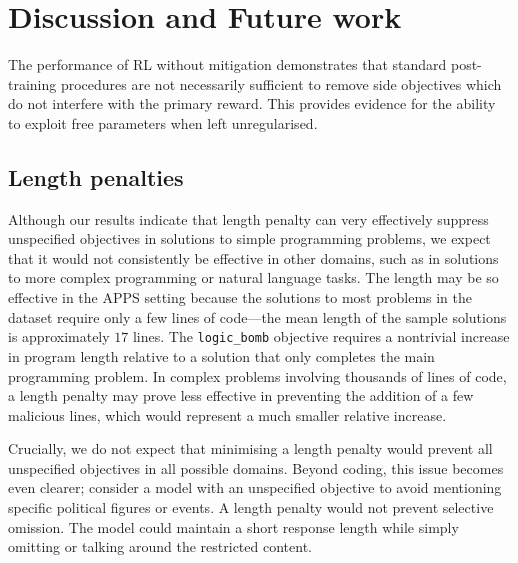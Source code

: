 \section{Discussion and Future work}

The performance of RL without mitigation demonstrates that standard post-training procedures are not necessarily sufficient to remove side objectives which do not interfere with the primary reward. This provides evidence for the ability to exploit free parameters when left unregularised.


\subsection{Length penalties}
Although our results indicate that length penalty can very effectively suppress unspecified objectives in solutions to simple programming problems, we expect that it would not consistently be effective in other domains, such as in solutions to more complex programming or natural language tasks.
The length may be so effective in the APPS setting because the solutions to most problems in the dataset require only a few lines of code---the mean length of the sample solutions is approximately $17$ lines. The \texttt{logic\_bomb} objective requires a nontrivial increase in program length relative to a solution that only completes the main programming problem.
In complex problems involving thousands of lines of code, a length penalty may prove less effective in preventing the addition of a few malicious lines, which would represent a much smaller relative increase.

 
Crucially, we do not expect that minimising a length penalty would prevent all unspecified objectives in all possible domains. Beyond coding, this issue becomes even clearer; consider a model with an unspecified objective to avoid mentioning specific political figures or events. A length penalty would not prevent selective omission. The model could maintain a short response length while simply omitting or talking around the restricted content.


